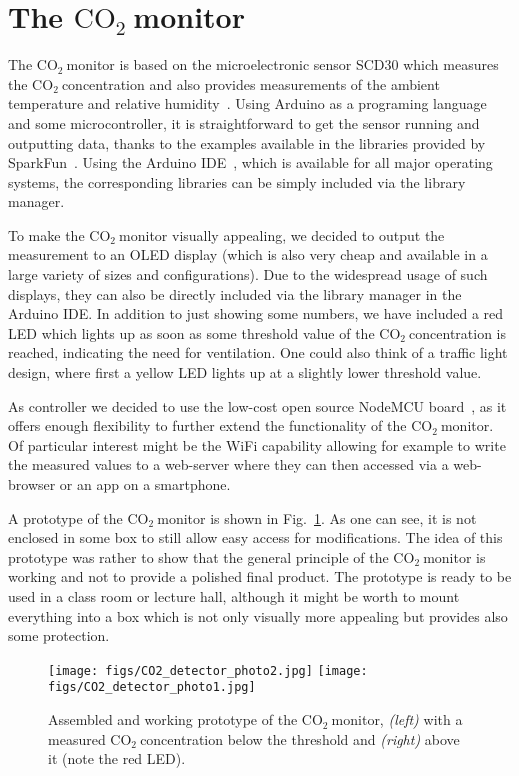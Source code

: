 \documentclass[12pt,a4paper]{article}
\newcommand{\coo}{\ensuremath{\mathrm{CO_2}~}}
\begin{document}
\section{The \coo monitor}
The \coo monitor is based on the microelectronic sensor SCD30 which measures the \coo concentration and also provides measurements of the ambient temperature and relative humidity~\cite{SENSIRION2020B}. Using Arduino as a programing language and some microcontroller, it is straightforward to get the sensor running and outputting data, thanks to the examples available in the libraries provided by SparkFun~\cite{SPARKFUN2020}. Using the Arduino IDE~\cite{ARDUINOIDE2020}, which is available for all major operating systems, the corresponding libraries can be simply included via the library manager. 

To make the \coo monitor visually appealing, we decided to output the measurement to an OLED display (which is also very cheap and available in a large variety of sizes and configurations). Due to the widespread usage of such displays, they can also be directly included via the library manager in the Arduino IDE. In addition to just showing some numbers, we have included a red LED which lights up as soon as some threshold value of the \coo concentration is reached, indicating the need for ventilation. One could also think of a traffic light design, where first a yellow LED lights up at a slightly lower threshold value.

As controller we decided to use the low-cost open source NodeMCU board~\cite{NODEMCU2020}, as it offers enough flexibility to further extend the functionality of the \coo monitor. Of particular interest might be the WiFi capability allowing for example to write the measured values to a web-server where they can then accessed via a web-browser or an app on a smartphone. 

A prototype of the \coo monitor is shown in Fig.~\ref{f:CO2_monitor_photo}. As one can see, it is not enclosed in some box to still allow easy access for modifications. The idea of this prototype was rather to show that the general principle of the \coo monitor is working and not to provide a polished final product. The prototype is ready to be used in a class room or lecture hall, although it might be worth to mount everything into a box which is not only visually more appealing but provides also some protection.
\begin{figure}[ht]
\center
\texttt{[image: figs/CO2\_detector\_photo2.jpg]}
\hspace{1em}
\texttt{[image: figs/CO2\_detector\_photo1.jpg]}
\caption{Assembled and working prototype of the \coo monitor, \textit{(left)} with a measured \coo concentration below the threshold and \textit{(right)} above it (note the red LED).}
\label{f:CO2_monitor_photo}
\end{figure}
\end{document}
